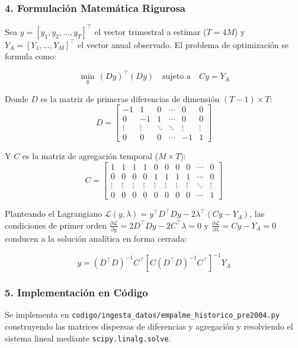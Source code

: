 \documentclass[11pt,a4paper]{article}
\begin{document}
\subsubsection{4. Formulación Matemática Rigurosa}
Sea $y = [y_1, y_2, \dots, y_T]^\top$ el vector trimestral a estimar ($T=4M$) y $Y_A = [Y_1, \dots, Y_M]^\top$ el vector anual observado. El problema de optimización se formula como:

\begin{equation}
\min_{y} \, (D y)^\top (D y) \quad \text{sujeto a} \quad C y = Y_A
\end{equation}

Donde $D$ es la matriz de primeras diferencias de dimensión $(T-1) \times T$:
\begin{equation}
D = \begin{bmatrix}
-1 & 1 & 0 & \cdots & 0 & 0 \\
0 & -1 & 1 & \cdots & 0 & 0 \\
\vdots & \vdots & \ddots & \ddots & \vdots & \vdots \\
0 & 0 & 0 & \cdots & -1 & 1
\end{bmatrix}
\end{equation}

Y $C$ es la matriz de agregación temporal ($M \times T$):
\begin{equation}
C = \begin{bmatrix}
1 & 1 & 1 & 1 & 0 & 0 & 0 & 0 & \cdots & 0 \\
0 & 0 & 0 & 0 & 1 & 1 & 1 & 1 & \cdots & 0 \\
\vdots & \vdots & \vdots & \vdots & \vdots & \vdots & \vdots & \vdots & \ddots & \vdots \\
0 & 0 & 0 & 0 & 0 & 0 & 0 & 0 & \cdots & 1
\end{bmatrix}
\end{equation}

Planteando el Lagrangiano $\mathcal{L}(y, \lambda) = y^\top D^\top D y - 2 \lambda^\top (C y - Y_A)$, las condiciones de primer orden $\frac{\partial \mathcal{L}}{\partial y} = 2 D^\top D y - 2 C^\top \lambda = 0$ y $\frac{\partial \mathcal{L}}{\partial \lambda} = C y - Y_A = 0$ conducen a la solución analítica en forma cerrada:

\begin{equation}
y = (D^\top D)^{-1} C^\top \left[ C (D^\top D)^{-1} C^\top \right]^{-1} Y_A
\end{equation}

\subsubsection{5. Implementación en Código}
Se implementa en \texttt{codigo/ingesta\_datos/empalme\_historico\_pre2004.py} construyendo las matrices dispersas de diferencias y agregación y resolviendo el sistema lineal mediante \texttt{scipy.linalg.solve}.
\end{document}
